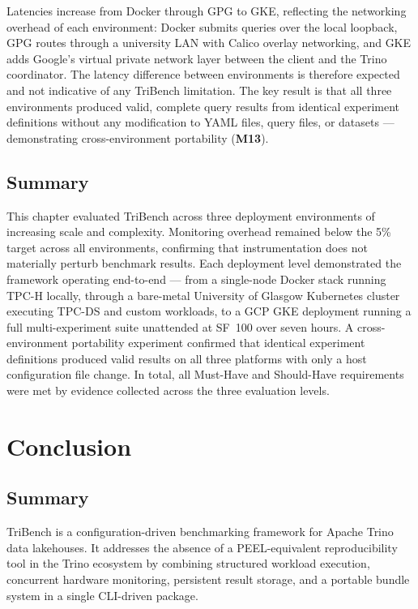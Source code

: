 \documentclass{l4proj}
\begin{document}
\noindent Latencies increase from Docker through GPG to GKE, reflecting the networking overhead of each environment: Docker submits queries over the local loopback, GPG routes through a university LAN with Calico overlay networking, and GKE adds Google's virtual private network layer between the client and the Trino coordinator. The latency difference between environments is therefore expected and not indicative of any TriBench limitation. The key result is that all three environments produced valid, complete query results from identical experiment definitions without any modification to YAML files, query files, or datasets --- demonstrating cross-environment portability (\textbf{M13}).

\section{Summary}
\label{sec:eval_summary}

This chapter evaluated TriBench across three deployment environments of increasing scale and complexity. Monitoring overhead remained below the 5\% target across all environments, confirming that instrumentation does not materially perturb benchmark results. Each deployment level demonstrated the framework operating end-to-end --- from a single-node Docker stack running TPC-H locally, through a bare-metal University of Glasgow Kubernetes cluster executing TPC-DS and custom workloads, to a GCP GKE deployment running a full multi-experiment suite unattended at SF~100 over seven hours. A cross-environment portability experiment confirmed that identical experiment definitions produced valid results on all three platforms with only a host configuration file change. In total, all Must-Have and Should-Have requirements were met by evidence collected across the three evaluation levels.


\chapter{Conclusion}
\label{chap:conclusion}

\section{Summary}
\label{sec:conclusion_summary}

TriBench is a configuration-driven benchmarking framework for Apache Trino data lakehouses. It addresses the absence of a PEEL-equivalent reproducibility tool in the Trino ecosystem by combining structured workload execution, concurrent hardware monitoring, persistent result storage, and a portable bundle system in a single CLI-driven package.
\end{document}
